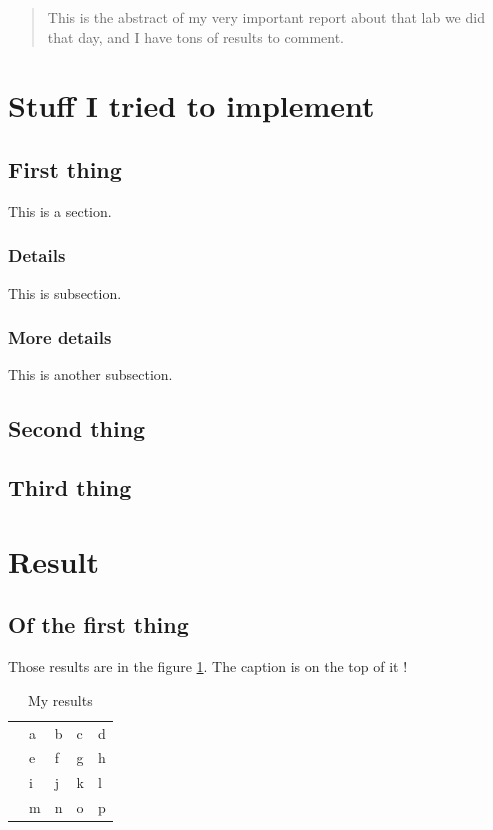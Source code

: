 \documentclass{cranfieldChart}
\begin{document}

\begin{abstract}
This is the abstract of my very important report about that lab we did that day, and I have tons of results to comment.
\end{abstract}

\newpage
\tableofcontents
\newpage
\listoffigures
\newpage
\listoftables
\newpage
\section{Stuff I tried to implement}
\subsection{First thing}
This is a section.
\subsubsection{Details}
This is subsection.
\subsubsection{More details}
This is another subsection.
\subsection{Second thing}
\subsection{Third thing}
\newpage
\section{Result}
\subsection{Of the first thing}
Those results are in the figure \ref{resuts}. The caption is on the top of it !
\begin{table}[!h]
	\centering
	\caption{My results}
	\label{resuts}
	\begin{tabular}{lllll}
		& a  & b  & c & d \\
		& e & f & g & h \\
		& i & j & k & l \\
		& m & n & o & p
	\end{tabular}
\end{table}
\end{document}
